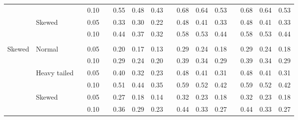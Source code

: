 \documentclass{article} %
\begin{document}
\begin{table}[ht]
\begin{scriptsize}
\begin{center}
\begin{tabular}{ll p{.1cm} c p{.1cm} rrr p{.1cm} rrr p{.1cm} rrr}
             &              && 0.10 &&   0.55 & 0.48 & 0.43 && 0.68 & 0.64 & 0.53 && 0.68 & 0.64 & 0.53 \\ 
             & Skewed       && 0.05 &&   0.33 & 0.30 & 0.22 && 0.48 & 0.41 & 0.33 && 0.48 & 0.41 & 0.33 \\ 
             &              && 0.10 &&   0.44 & 0.37 & 0.32 && 0.58 & 0.53 & 0.44 && 0.58 & 0.53 & 0.44 \\
             &&&&&&&&&&&&&&&\\ 
Skewed       & Normal       && 0.05 &&   0.20 & 0.17 & 0.13 && 0.29 & 0.24 & 0.18 && 0.29 & 0.24 & 0.18 \\ 
             &              && 0.10 &&   0.29 & 0.24 & 0.20 && 0.39 & 0.34 & 0.29 && 0.39 & 0.34 & 0.29 \\ 
             & Heavy tailed && 0.05 &&   0.40 & 0.32 & 0.23 && 0.48 & 0.41 & 0.31 && 0.48 & 0.41 & 0.31 \\ 
             &              && 0.10 &&   0.51 & 0.44 & 0.35 && 0.59 & 0.52 & 0.42 && 0.59 & 0.52 & 0.42 \\ 
             & Skewed       && 0.05 &&   0.27 & 0.18 & 0.14 && 0.32 & 0.23 & 0.18 && 0.32 & 0.23 & 0.18 \\ 
             &              && 0.10 &&   0.36 & 0.29 & 0.23 && 0.44 & 0.33 & 0.27 && 0.44 & 0.33 & 0.27 \\ 


\end{tabular}
\end{center}
\end{scriptsize}
\end{table}
\end{document}
